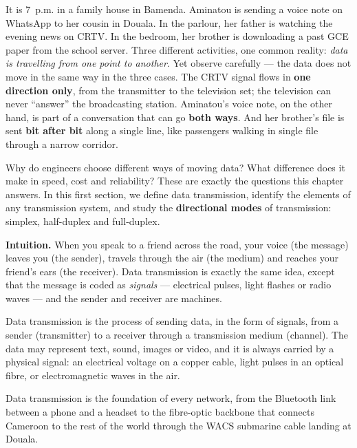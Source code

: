 \documentclass[11pt]{article}
\newcommand{\cle}[1]{{\popxbold\color{popdark}#1}}
\newcounter{popsec}
\newcounter{popsub}
\newcommand{\courssub}[1]{%
  \stepcounter{popsub}%
  \par\vspace{9pt}\noindent{\popxbold\fontsize{11.5}{13}\selectfont\color{popink}{\color{poporange}\thepopsec.\thepopsub}\hspace{6pt}#1}\par\nopagebreak\vspace{4pt}
}
\begin{document}
It is 7~p.m. in a family house in Bamenda. Aminatou is sending a voice note on WhatsApp to her cousin in Douala. In the parlour, her father is watching the evening news on CRTV. In the bedroom, her brother is downloading a past GCE paper from the school server. Three different activities, one common reality: \emph{data is travelling from one point to another}. Yet observe carefully --- the data does not move in the same way in the three cases. The CRTV signal flows in \textbf{one direction only}, from the transmitter to the television set; the television can never ``answer'' the broadcasting station. Aminatou's voice note, on the other hand, is part of a conversation that can go \textbf{both ways}. And her brother's file is sent \textbf{bit after bit} along a single line, like passengers walking in single file through a narrow corridor.

Why do engineers choose different ways of moving data? What difference does it make in speed, cost and reliability? These are exactly the questions this chapter answers. In this first section, we define data transmission, identify the elements of any transmission system, and study the \textbf{directional modes} of transmission: simplex, half-duplex and full-duplex.

\courssub{What is Data Transmission?}

\textbf{Intuition.} When you speak to a friend across the road, your voice (the message) leaves you (the sender), travels through the air (the medium) and reaches your friend's ears (the receiver). Data transmission is exactly the same idea, except that the message is coded as \emph{signals} --- electrical pulses, light flashes or radio waves --- and the sender and receiver are machines.

\begin{definition}
\cle{Data transmission} is the process of sending data, in the form of signals, from a sender (transmitter) to a receiver through a transmission medium (channel). The data may represent text, sound, images or video, and it is always carried by a physical signal: an electrical voltage on a copper cable, light pulses in an optical fibre, or electromagnetic waves in the air.
\end{definition}

Data transmission is the foundation of every network, from the Bluetooth link between a phone and a headset to the fibre-optic backbone that connects Cameroon to the rest of the world through the WACS submarine cable landing at Douala.
\end{document}
